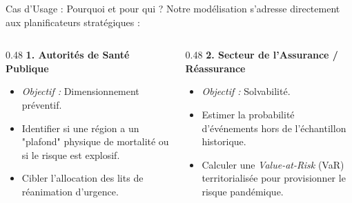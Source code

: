 \documentclass[10pt, aspectratio=1610]{beamer}
\begin{document}
\begin{frame}{Cas d'Usage : Pourquoi et pour qui ?}
    Notre modélisation s'adresse directement aux planificateurs stratégiques :
    \vspace{0.4cm}

    \begin{columns}
        \begin{column}{0.48\textwidth}
            \textbf{1. Autorités de Santé Publique}
            \begin{itemize}
                \item \textit{Objectif :} Dimensionnement préventif.
                \item Identifier si une région a un "plafond" physique de mortalité ou si le risque est explosif.
                \item Cibler l'allocation des lits de réanimation d'urgence.
            \end{itemize}
        \end{column}
        \begin{column}{0.48\textwidth}
            \textbf{2. Secteur de l'Assurance / Réassurance}
            \begin{itemize}
                \item \textit{Objectif :} Solvabilité.
                \item Estimer la probabilité d'événements hors de l'échantillon historique.
                \item Calculer une \textit{Value-at-Risk} (VaR) territorialisée pour provisionner le risque pandémique.
            \end{itemize}
        \end{column}
    \end{columns}
\end{frame}
\end{document}
